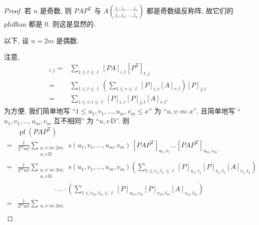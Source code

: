 \documentclass[../libro]{subfiles}
\begin{document}
\begin{proof}
    若 \(n\) 是奇数, 则
    \(P A P^{\mathrm{T}}\)
    与
    \(\displaystyle
    A\binom{j_1,j_2,\dots,j_{n}}{j_1,j_2,\dots,j_{n}}\)
    都是奇数级反称阵,
    故它们的 pfaffian 都是 \(0\).
    则这是显然的.

    以下, 设 \(n = 2m\) 是偶数.

    注意,
    \begin{align*}
        [P A P^{\mathrm{T}}]_{i,j}
        = {} &
        \sum_{1 \leq t \leq \ell}
        {[P A]_{i,t} [P^{\mathrm{T}}]_{t,j}}
        \\
        = {} &
        \sum_{1 \leq t \leq \ell}
        {
            \left(
            \sum_{1 \leq r \leq \ell}
            {[P]_{i,r} [A]_{r,t}}
            \right)
            [P]_{j,t}
        }
        \\
        = {} &
        \sum_{1 \leq r, t \leq \ell}
        {[P]_{i,r} [P]_{j,t} [A]_{r,t}}.
    \end{align*}
    为方便, 我们简单地写
    ``\(1 \leq u_1, v_1, \dots, u_m, v_m \leq x\)''
    为 ``\(u, v \text{:}\, m \text{:}\, x\)'',
    且简单地写 ``\(u_1, v_1, \dots, u_m, v_m\) 互不相同''
    为 ``\(u, v \,\text{D}\)''.
    则
    \begin{align*}
             &
        \operatorname{pf} {(P A P^{\mathrm{T}})}
        \\
        = {} &
        \frac{1}{2^m m!}
        \sum_{\substack{
        u, v \text{:}\, m \text{:}\, 2m; \\
                u, v \,\text{D}
            }}
        {s(u_1, v_1, \dots, u_m, v_m)\,
            [P A P^{\mathrm{T}}]_{u_1,v_1}
            \dots
            [P A P^{\mathrm{T}}]_{u_m,v_m}}
        \\
        = {} &
        \frac{1}{2^m m!}
        \sum_{\substack{
        u, v \text{:}\, m \text{:}\, 2m; \\
                u, v \,\text{D}
            }}
        s(u_1, v_1, \dots, u_m, v_m)
        \left(
        \sum_{1 \leq r_1, t_1 \leq \ell}
        {[P]_{u_1,r_1} [P]_{v_1,t_1} [A]_{r_1,t_1}}
        \right)
        \\
             &
        \quad \quad \quad \quad \quad \,
        {} \cdot
        \dots
        \cdot
        \left(
        \sum_{1 \leq r_m, t_m \leq \ell}
        {[P]_{u_m,r_m} [P]_{v_m,t_m} [A]_{r_m,t_m}}
        \right)
        \\
        = {} &
        \frac{1}{2^m m!}
        \sum_{\substack{
        u, v \text{:}\, m \text{:}\, 2m; \\
}}
\end{align*}
\end{proof}
\end{document}
